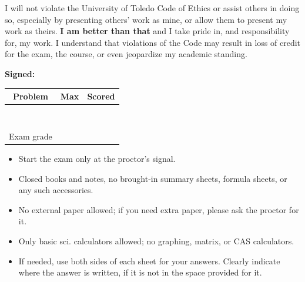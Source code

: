 \documentclass[10pt,twoside,sfsidenotes]{tufte-handout}
\date{} %
\begin{document}
\setlength\abovedisplayskip{2pt}
\setlength\belowdisplayskip{2pt}
\setlength\abovedisplayshortskip{2pt}
\setlength\belowdisplayshortskip{2pt}

\vspace*{1in}


   {\large I will not violate the University of Toledo Code of Ethics or assist others in doing so, especially by presenting others' work as mine, or allow them to present my work as theirs. \textbf{I am better than that} and I take pride in, and responsibility for, my work. I understand that violations of the Code may result in loss of credit for the exam, the course, or even jeopardize my academic standing.

\vspace{.5in}

    \textbf{Signed:}
  }

  \vfill


\begin{center}\Large
  \begin{tabular}{c | c | c}
    Problem & Max & Scored \\ \hline
     & & \\ \hline
     & & \\ \hline
     & & \\ \hline
     & & \\ \hline
     & & \\ \hline
     & & \\ \hline
     & & \\ \hline
     & & \\ \hline
    Exam grade & & \\ \hline
  \end{tabular}
  \end{center}

  \vfill

  \begin{fullwidth}
{\large
  \begin{itemize}
    \item Start the exam only at the proctor's signal.
  \item Closed books and notes, no brought-in summary sheets, formula sheets, or any such accessories.
  \item No external paper allowed; if you need extra paper, please ask the proctor for it.
  \item Only basic sci. calculators allowed; no graphing, matrix, or CAS calculators.
  \item If needed, use both sides of each sheet for your answers. Clearly indicate where the answer is written, if it is not in the space provided for it.
  \end{itemize}
  }
\end{fullwidth}
\clearpage
\end{document}
